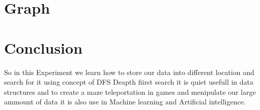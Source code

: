 \documentclass[11pt]{article}            %
\begin{document}
\section{Graph} 

\section{Conclusion}  So in this Experiment we learn how to store our data into different location and search for it using concept of DFS Deapth fiirst search
it is quiet usefull in data structures and to create a maze teleportation in games and menipulate our large ammount of data
it is also use in Machine learning and Artificial intelligence. \\ \\ 
\end{document}
